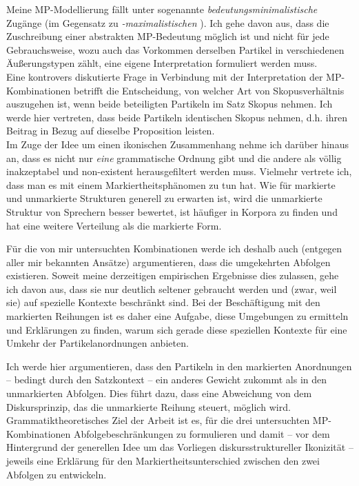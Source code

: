 Meine MP-Modellierung fällt unter sogenannte \textit{bedeutungsminimalistische} Zu\-gänge (im Gegensatz zu \textit{-maximalistischen} ). Ich gehe davon aus, dass die Zuschreibung einer abstrakten MP-Bedeutung möglich ist und nicht für jede Gebrauchs\-weise, wozu auch das Vorkommen derselben Partikel in verschiedenen Äuße\-rungstypen zählt, eine eigene Interpretation formuliert werden muss. \\

\noindent
Eine kontrovers diskutierte Frage in Verbindung mit der Interpretation der MP-Kombinationen betrifft die Entscheidung, von welcher Art von Skopusverhältnis auszugehen ist, wenn beide beteiligten Partikeln im Satz Skopus nehmen. Ich werde hier vertreten, dass beide Partikeln identischen Skopus nehmen, d.h. ihren Beitrag in Bezug auf dieselbe Proposition leisten. \\

\noindent
Im Zuge der Idee um einen ikonischen Zusammenhang nehme ich darüber hi\-naus an, dass es nicht nur \emph{eine} grammatische Ordnung gibt und die andere als völlig inakzeptabel und non-existent herausgefiltert werden muss. Vielmehr vertrete ich, dass man es mit einem Markiertheitsphänomen zu tun hat. Wie für markierte und unmarkierte Strukturen generell zu erwarten ist, wird die unmarkierte Struktur von Sprechern besser bewertet, ist häufiger in Korpora zu finden und hat eine weitere Verteilung als die markierte Form. 

Für die von mir untersuchten Kombinationen werde ich deshalb auch (entgegen aller mir bekannten Ansätze) argumentieren, dass die umgekehrten Abfolgen existieren. Soweit meine derzeitigen empirischen Ergebnisse dies zulassen, gehe ich davon aus, dass sie nur deutlich seltener gebraucht werden und (zwar, weil sie) auf spezielle Kontexte beschränkt sind. Bei der Beschäftigung mit den markierten Reihungen ist es daher eine Aufgabe, diese Umgebungen zu ermitteln und Erklärungen zu finden, warum sich gerade diese speziellen Kontexte für eine Umkehr der Partikelanordnungen anbieten. 

Ich werde hier argumentieren, dass den Partikeln in den markierten Anordnungen – bedingt durch den Satzkontext – ein anderes Gewicht zukommt als in den unmarkierten Abfolgen. Dies führt dazu, dass eine Abweichung von dem Diskursprinzip, das die unmarkierte Reihung steuert, möglich wird. \\

\noindent
Grammatiktheoretisches Ziel der Arbeit ist es, für die drei untersuchten MP-Kombinationen Abfolgebeschränkungen zu formulieren und damit – vor dem Hintergrund der generellen Idee um das Vorliegen diskursstruktureller Ikoni\-zität – jeweils eine Erklärung für den Markiertheitsunterschied zwischen den zwei Abfolgen zu entwickeln. \\


